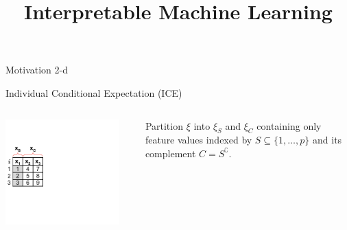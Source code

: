 \documentclass[11pt,compress,t,notes=noshow, aspectratio=169, xcolor=table]{beamer}
\title{Interpretable Machine Learning}
\date{}
\begin{document}
\newcommand{\titlefigure}{figure/feature-effect}
\newcommand{\learninggoals}{
\item Intro to feature effects
\item ICE plots
}



\begin{frame}{Motivation}
2-d
\end{frame}

\begin{frame}{Individual Conditional Expectation (ICE) }

\begin{columns}[T]
\begin{column}{0.18\textwidth} %
\includegraphics[page=1, trim=0cm 0.35cm 4.53cm 0.35cm, clip, width=0.9\textwidth]{figure_man/ice_plot_demo}
\end{column}
\begin{column}{0.82\textwidth}


Partition $\xi$ into $\xi_S$ and $\xi_C$ containing only feature values indexed by $S \subseteq \{1, \dots, p\}$ and its complement $C = S^\complement$.
\lz


\end{column}
\end{columns}
\end{frame}
\end{document}
